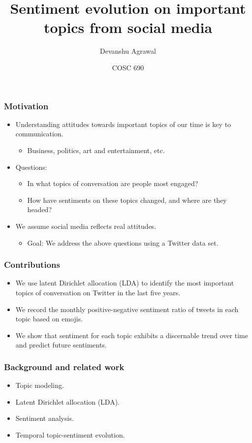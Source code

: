 \documentclass{beamer}
\title{Sentiment evolution on important topics from social media}
\author{Devanshu Agrawal}
\date{COSC 690}
\begin{document}
\begin{frame}
\titlepage
\end{frame}

\begin{frame}
\frametitle{Motivation}
\begin{itemize}
\item Understanding attitudes towards important topics of our time is key to communication.
\begin{itemize}
\item Business, politics, art and entertainment, etc.
\end{itemize}
\item Questions:
\begin{itemize}
\item In what topics of conversation are people most engaged?
\item How have sentiments on these topics changed, and where are they headed?
\end{itemize}
\item We assume social media reflects real attitudes.
\begin{itemize}
\item Goal: We address the above questions using a Twitter data set.
\end{itemize}
\end{itemize}
\end{frame}

\begin{frame}
\frametitle{Contributions}
\begin{itemize}
\item We use latent Dirichlet allocation (LDA) to identify the most important topics of conversation on Twitter in the last five years.
\item We record the monthly positive-negative sentiment ratio of tweets in each topic based on emojis.
\item We show that sentiment for each topic exhibits a discernable trend over time and predict future sentiments.
\end{itemize}
\end{frame}

\begin{frame}
\frametitle{Background and related work}
\begin{itemize}
\item Topic modeling.
\item Latent Dirichlet allocation (LDA).
\item Sentiment analysis.
\item Temporal topic-sentiment evolution.
\end{itemize}
\end{frame}
\end{document}
